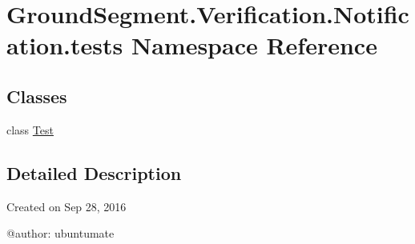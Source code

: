 \hypertarget{namespace_ground_segment_1_1_verification_1_1_notification_1_1tests}{}\section{Ground\+Segment.\+Verification.\+Notification.\+tests Namespace Reference}
\label{namespace_ground_segment_1_1_verification_1_1_notification_1_1tests}
\subsection*{Classes}
\begin{DoxyCompactItemize}
\item 
class \hyperlink{class_ground_segment_1_1_verification_1_1_notification_1_1tests_1_1_test}{Test}
\end{DoxyCompactItemize}


\subsection{Detailed Description}
\begin{DoxyVerb}Created on Sep 28, 2016

@author: ubuntumate
\end{DoxyVerb}
 